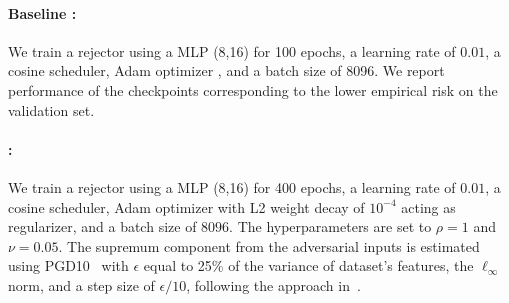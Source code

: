 \begin{appendices}
\begin{table}[ht]\label{agent:housing}
\centering{}
\caption{Agent RMSE on the California Housing validation set ($20$\% of the dataset).}
\end{table}

\paragraph{Baseline \citep{mao2024regressionmultiexpertdeferral}:} We train a rejector using a MLP (8,16) for 100 epochs, a learning rate of $0.01$, a cosine scheduler, Adam optimizer \citep{kingma2017adammethodstochasticoptimization}, and a batch size of 8096. We report performance of the checkpoints corresponding to the lower empirical risk on the validation set.

\paragraph{\name{}:}  We train a rejector using a MLP (8,16) for 400 epochs, a learning rate of $0.01$, a cosine scheduler, Adam optimizer \citep{kingma2017adammethodstochasticoptimization} with L2 weight decay of $10^{-4}$ acting as regularizer, and a batch size of $8096$. The hyperparameters are set to $\rho = 1$ and $\nu = 0.05$. The supremum component from the adversarial inputs is estimated using PGD10~\citep{Madry2017TowardsDL} with $\epsilon$ equal to 25\% of the variance of dataset's features, the $\ell_\infty$ norm, and a step size of $\epsilon / 10$, following the approach in~\citep{mao2023crossentropylossfunctionstheoretical, Grounded}.

\begin{table}[ht]
\centering{}
\caption{Performance comparison of \name{} with the baseline \citep{mao2024regressionmultiexpertdeferral} on the California Housing dataset. The table reports Root Mean Square Error (RMSE) under clean and adversarial scenarios.}
\end{table}


\end{appendices}
